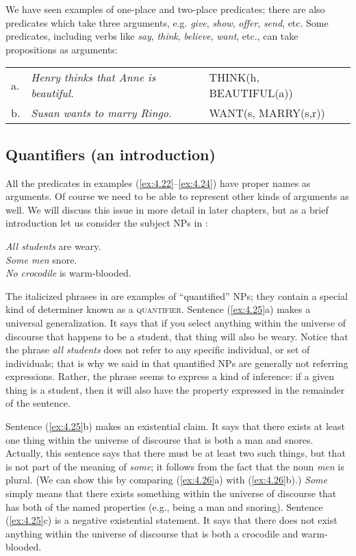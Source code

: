 We have seen examples of one-place and two-place predicates; there are also predicates which take three arguments, e.g. \textit{give}, \textit{show}, \textit{offer}, \textit{send}, etc. Some predicates, including verbs like \textit{say}, \textit{think}, \textit{believe}, \textit{want}, etc., can take propositions as arguments:


\ea \label{ex:4.24}
\begin{tabular}[t]{lll}
a. & \textit{Henry thinks that Anne is beautiful.}  & THINK(h, BEAUTIFUL(a))\\
b. & \textit{Susan wants to marry Ringo.} & WANT(s, MARRY(s,r))
\end{tabular}
\z

\subsection{Quantifiers (an introduction)}\label{sec:4.4.1}

All the predicates in examples (\ref{ex:4.22}--\ref{ex:4.24}) have proper names as arguments. Of course we need to be able to represent other kinds of arguments as well. We will discuss this issue in more detail in later chapters, but as a brief introduction let us consider the subject NPs in :


\ea \label{ex:4.25}
\ea \textit{All students} are weary.\\
\ex \textit{Some men} snore.\\
\ex \textit{No crocodile} is warm-blooded.
                       \z
\z

The italicized phrases in  are examples of “quantified” NPs; they contain a special kind of determiner known as a \textsc{quantifier}. Sentence (\ref{ex:4.25}a) makes a universal generalization. It says that if you select anything within the universe of discourse that happens to be a student, that thing will also be weary. Notice that the phrase \textit{all students} does not refer to any specific individual, or set of individuals; that is why we said in  that quantified NPs are generally not referring expressions. Rather, the phrase seems to express a kind of inference: if a given thing is a student, then it will also have the property expressed in the remainder of the sentence.


Sentence (\ref{ex:4.25}b) makes an existential claim. It says that there exists at least one thing within the universe of discourse that is both a man and snores. Actually, this sentence says that there must be at least two such things, but that is not part of the meaning of \textit{some}; it follows from the fact that the noun \textit{men} is plural. (We can show this by comparing (\ref{ex:4.26}a) with (\ref{ex:4.26}b).) \textit{Some} simply means that there exists something within the universe of discourse that has both of the named properties (e.g., being a man and snoring). Sentence (\ref{ex:4.25}c) is a negative existential statement. It says that there does not exist anything within the universe of discourse that is both a crocodile and warm-blooded.


